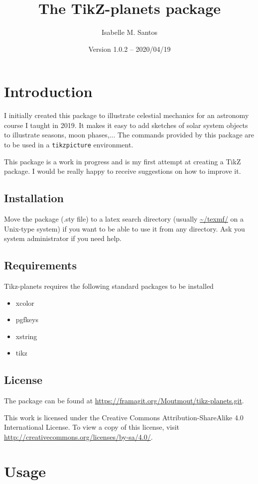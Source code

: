 \documentclass[12pt, twocolumn]{article}
\title{The TikZ-planets package}
\author{Isabelle M. Santos}
\date{Version 1.0.2 -- 2020/04/19}
\begin{document}
\maketitle
\tableofcontents

\section{Introduction}
I initially created this package to illustrate celestial mechanics for an astronomy course I taught in 2019. 
It makes it easy to add sketches of solar system objects to illustrate seasons, moon phases,... 
The commands provided by this package are to be used in a \verb|tikzpicture| environment. 

This package is a work in progress and is my first attempt at creating a TikZ package. I would be really happy to receive suggestions on how to improve it. 

\subsection{Installation}
Move the package (.sty file) to a latex search directory (usually \url{~/texmf/} on a Unix-type system) if you want to be able to use it from any directory. 
Ask you system administrator if you need help.

\subsection{Requirements}
Tikz-planets requires the following standard packages to be installed
\begin{itemize}
\item xcolor
\item pgfkeys
\item xstring
\item tikz
\end{itemize}

\subsection{License}
The package can be found at \url{https://framagit.org/Moutmout/tikz-planets.git}. 

This work is licensed under the Creative Commons Attribution-ShareAlike 4.0 International License. To view a copy of this license, visit \url{http://creativecommons.org/licenses/by-sa/4.0/}.

\section{Usage}
\end{document}

